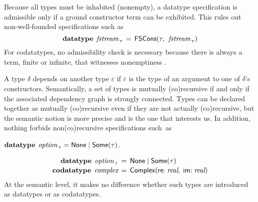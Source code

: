 \begin{report}%
Because all types must be inhabited (nonempty), a datatype specification is
admissible only if a ground constructor term can be exhibited.
This rules out non-well-founded specifications such as
\[\textbf{datatype}\;\, \textit{fstream}_{\,\tau} \,=\, \textsf{FSCons}(\tau,\:\, \textit{fstream}_{\,\tau})\]
For codatatypes, no admissibility check is necessary because there is always a term,
finite or infinite, that witnesses nonemptiness \cite{blanchette-et-al-2015-esop}.
\end{report}

A type $\delta$ depends on another type $\varepsilon$ if $\varepsilon$ is the
type of an argument to one of $\delta$'s constructors. Semantically, a set of
types is mutually (co)recursive if and only if the associated dependency graph
is strongly connected. Types can be declared together as mutually
(co)recursive even if they are not actually (co)recursive, but the
semantic notion is more precise and is the one that interests us.
%
In addition, nothing forbids non(co)recursive specifications
such~as
\begin{paper}%
\vthinspace$\keyw{datatype}~\vthinspace\ty{option}_{\,\tau} = \const{None} \mid \const{Some}(\tau)$.%
\end{paper}%
\begin{report}%
\[\begin{aligned}[t]
      \textbf{datatype}\;\, \textit{option}_{\,\tau} & \,=\, \textsf{None} \mid \textsf{Some}(\tau) \\[-.5\jot]
      \textbf{codatatype}\; \,\textit{complex} & \,=\, \textsf{Complex}(\textsf{re}{:}\; \textit{real},\; \textsf{im}{:}\;\textit{real})
\end{aligned}
\]
At the semantic level, it makes no difference whether such types are
introduced as datatypes or as codatatypes.
\end{report}%

%
%

